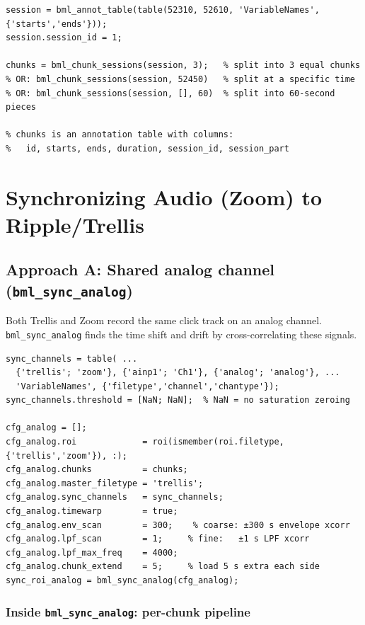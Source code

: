 \documentclass[11pt, a4paper]{article}
\begin{document}
\begin{lstlisting}[style=matlab, caption={Step 2: define session chunks}]
session = bml_annot_table(table(52310, 52610, 'VariableNames', {'starts','ends'}));
session.session_id = 1;

chunks = bml_chunk_sessions(session, 3);   % split into 3 equal chunks
% OR: bml_chunk_sessions(session, 52450)   % split at a specific time
% OR: bml_chunk_sessions(session, [], 60)  % split into 60-second pieces

% chunks is an annotation table with columns:
%   id, starts, ends, duration, session_id, session_part
\end{lstlisting}

\section{Synchronizing Audio (Zoom) to Ripple/Trellis}

\subsection{Approach A: Shared analog channel (\texttt{bml\_sync\_analog})}

Both Trellis and Zoom record the same click track on an analog channel. \texttt{bml\_sync\_analog} finds the time shift and drift by cross-correlating these signals.

\begin{lstlisting}[style=matlab]
sync_channels = table( ...
  {'trellis'; 'zoom'}, {'ainp1'; 'Ch1'}, {'analog'; 'analog'}, ...
  'VariableNames', {'filetype','channel','chantype'});
sync_channels.threshold = [NaN; NaN];  % NaN = no saturation zeroing

cfg_analog = [];
cfg_analog.roi             = roi(ismember(roi.filetype,{'trellis','zoom'}), :);
cfg_analog.chunks          = chunks;
cfg_analog.master_filetype = 'trellis';
cfg_analog.sync_channels   = sync_channels;
cfg_analog.timewarp        = true;
cfg_analog.env_scan        = 300;    % coarse: ±300 s envelope xcorr
cfg_analog.lpf_scan        = 1;     % fine:   ±1 s LPF xcorr
cfg_analog.lpf_max_freq    = 4000;
cfg_analog.chunk_extend    = 5;     % load 5 s extra each side
sync_roi_analog = bml_sync_analog(cfg_analog);
\end{lstlisting}

\subsubsection{Inside \texttt{bml\_sync\_analog}: per-chunk pipeline}
\end{document}
